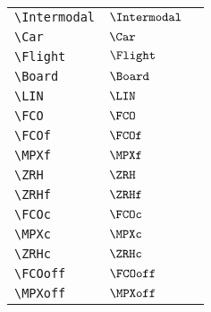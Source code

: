 \begin{longtable}{lll}
  {\color[rgb]{0.5,0.5,0.5}\texttt{\textbackslash Intermodal}}                                              & $\Intermodal$              & \\
  {\color[rgb]{0.5,0.5,0.5}\texttt{\textbackslash Car}}                                                     & $\Car$                     & \\
  {\color[rgb]{0.5,0.5,0.5}\texttt{\textbackslash Flight}}                                                  & $\Flight$                  & \\
  {\color[rgb]{0.5,0.5,0.5}\texttt{\textbackslash Board}}                                                   & $\Board$                   & \\
  {\color[rgb]{0.5,0.5,0.5}\texttt{\textbackslash LIN}}                                                     & $\LIN$                     & \\
  {\color[rgb]{0.5,0.5,0.5}\texttt{\textbackslash FCO}}                                                     & $\FCO$                     & \\
  {\color[rgb]{0.5,0.5,0.5}\texttt{\textbackslash FCOf}}                                                    & $\FCOf$                    & \\
  {\color[rgb]{0.5,0.5,0.5}\texttt{\textbackslash MPXf}}                                                    & $\MPXf$                    & \\
  {\color[rgb]{0.5,0.5,0.5}\texttt{\textbackslash ZRH}}                                                     & $\ZRH$                     & \\
  {\color[rgb]{0.5,0.5,0.5}\texttt{\textbackslash ZRHf}}                                                    & $\ZRHf$                    & \\
  {\color[rgb]{0.5,0.5,0.5}\texttt{\textbackslash FCOc}}                                                    & $\FCOc$                    & \\
  {\color[rgb]{0.5,0.5,0.5}\texttt{\textbackslash MPXc}}                                                    & $\MPXc$                    & \\
  {\color[rgb]{0.5,0.5,0.5}\texttt{\textbackslash ZRHc}}                                                    & $\ZRHc$                    & \\
  {\color[rgb]{0.5,0.5,0.5}\texttt{\textbackslash FCOoff}}                                                  & $\FCOoff$                  & \\
  {\color[rgb]{0.5,0.5,0.5}\texttt{\textbackslash MPXoff}}                                                  & $\MPXoff$                  & \\

\end{longtable}
